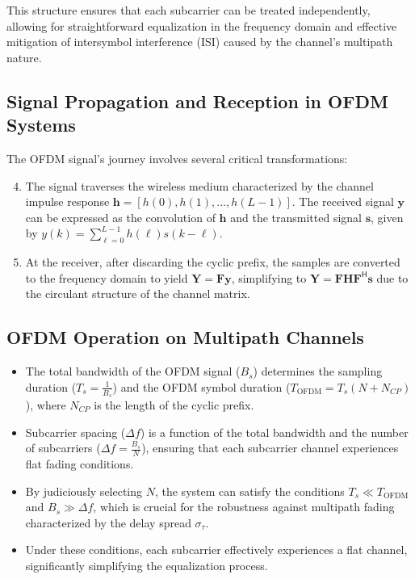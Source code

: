 This structure ensures that each subcarrier can be treated independently, allowing for straightforward equalization in the frequency domain and effective mitigation of intersymbol interference (ISI) caused by the channel's multipath nature.



\subsection*{Signal Propagation and Reception in OFDM Systems}

The OFDM signal's journey involves several critical transformations:

\begin{enumerate}
    \setcounter{enumi}{3}
    \item The signal traverses the wireless medium characterized by the channel impulse response \(\mathbf{h} = [h(0), h(1), \ldots, h(L - 1)]\). The received signal \(\mathbf{y}\) can be expressed as the convolution of \(\mathbf{h}\) and the transmitted signal \(\mathbf{s}\), given by \(y(k) = \sum_{\ell=0}^{L-1} h(\ell)s(k - \ell)\).
    \item At the receiver, after discarding the cyclic prefix, the samples are converted to the frequency domain to yield \(\mathbf{Y} = \mathbf{F}\mathbf{y}\), simplifying to \(\mathbf{Y} = \mathbf{F}\mathbf{H}\mathbf{F}^\mathsf{H}\mathbf{s}\) due to the circulant structure of the channel matrix.
\end{enumerate}

\subsection*{OFDM Operation on Multipath Channels}

\begin{itemize}
    \item The total bandwidth of the OFDM signal (\(B_s\)) determines the sampling duration (\(T_s = \frac{1}{B_s}\)) and the OFDM symbol duration (\(T_{\text{OFDM}} = T_s(N + N_{CP})\)), where \(N_{CP}\) is the length of the cyclic prefix.
    \item Subcarrier spacing (\(\Delta f\)) is a function of the total bandwidth and the number of subcarriers (\(\Delta f = \frac{B_s}{N}\)), ensuring that each subcarrier channel experiences flat fading conditions.
    \item By judiciously selecting \(N\), the system can satisfy the conditions \(T_s \ll T_{\text{OFDM}}\) and \(B_s \gg \Delta f\), which is crucial for the robustness against multipath fading characterized by the delay spread \(\sigma_\tau\).
    \item Under these conditions, each subcarrier effectively experiences a flat channel, significantly simplifying the equalization process.
\end{itemize}


